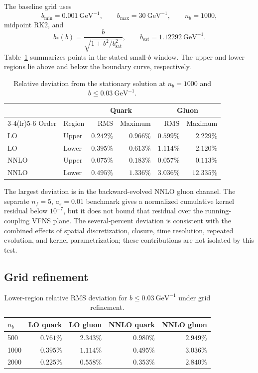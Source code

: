 \documentclass[11pt]{article}
\newcommand{\as}{a_s}
\begin{document}
The baseline grid uses
\[
  b_{\min}=0.001~\mathrm{GeV}^{-1},\qquad
  b_{\max}=30~\mathrm{GeV}^{-1},\qquad
  n_b=1000,
\]
midpoint RK2, and
\[
  b_*(b)=\frac{b}{\sqrt{1+b^2/b_{\mathrm{sat}}^2}},
  \qquad
  b_{\mathrm{sat}}=1.12292~\mathrm{GeV}^{-1}.
\]
Table~\ref{tab:stationary-1000} summarizes points in the stated small-\(b\)
window.
The upper and lower regions lie above and below the boundary curve,
respectively.

\begin{table}[H]
\centering
\caption{Relative deviation from the stationary solution at \(n_b=1000\) and
\(b\le0.03~\mathrm{GeV}^{-1}\).}
\label{tab:stationary-1000}
\begin{tabular}{llrrrr}
\toprule
& & \multicolumn{2}{c}{Quark} & \multicolumn{2}{c}{Gluon}\\
\cmidrule(lr){3-4}\cmidrule(lr){5-6}
Order & Region & RMS & Maximum & RMS & Maximum\\
\midrule
LO & Upper & \(0.242\%\) & \(0.966\%\) & \(0.599\%\) & \(2.229\%\)\\
LO & Lower & \(0.395\%\) & \(0.613\%\) & \(1.114\%\) & \(2.120\%\)\\
NNLO & Upper & \(0.075\%\) & \(0.183\%\) & \(0.057\%\) & \(0.113\%\)\\
NNLO & Lower & \(0.495\%\) & \(1.336\%\) & \(3.036\%\) & \(12.335\%\)\\
\bottomrule
\end{tabular}
\end{table}

The largest deviation is in the backward-evolved NNLO gluon channel. The
separate \(n_f=5\), \(\as=0.01\) benchmark gives a normalized cumulative
kernel residual below \(10^{-7}\), but it does not bound that residual over
the running-coupling VFNS plane. The several-percent deviation is consistent
with the combined effects of spatial discretization, closure, time
resolution, repeated evolution, and kernel parametrization; these
contributions are not isolated by this test.

\subsection{Grid refinement}

\begin{table}[H]
\centering
\caption{Lower-region relative RMS deviation for
\(b\le0.03~\mathrm{GeV}^{-1}\) under grid refinement.}
\label{tab:lower-refinement}
\begin{tabular}{lrrrr}
\toprule
\(n_b\) & LO quark & LO gluon & NNLO quark & NNLO gluon\\
\midrule
500 & \(0.761\%\) & \(2.343\%\) & \(0.980\%\) & \(2.949\%\)\\
1000 & \(0.395\%\) & \(1.114\%\) & \(0.495\%\) & \(3.036\%\)\\
2000 & \(0.225\%\) & \(0.558\%\) & \(0.353\%\) & \(2.840\%\)\\
\bottomrule
\end{tabular}
\end{table}
\end{document}
